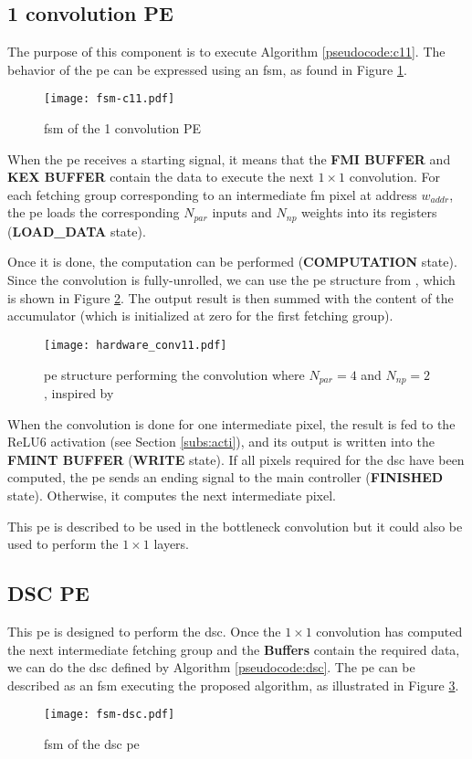 \subsection{1 convolution PE}
%
The purpose of this component is to execute Algorithm \ref{pseudocode:c11}. The behavior of the \acrshort{pe} can be expressed using an \acrshort{fsm}, as found in Figure \ref{fig:fsm_c11}.
%
\begin{figure}[H]
    \centering
    \texttt{[image: fsm-c11.pdf]}
    \caption{\acrshort{fsm} of the 1 convolution PE}
    \label{fig:fsm_c11}
\end{figure}
%
When the \acrshort{pe} receives a starting signal, it means that the \textbf{FMI BUFFER} and \textbf{KEX BUFFER} contain the data to execute the next $1 \times 1$ convolution. For each fetching group corresponding to an intermediate \acrshort{fm} pixel at address $w_{addr}$, the \acrshort{pe} loads the corresponding $N_{par}$ inputs and $N_{np}$ weights into its registers (\textbf{LOAD\_DATA} state).

Once it is done, the computation can be performed (\textbf{COMPUTATION} state). Since the convolution is fully-unrolled, we can use the \acrshort{pe} structure from \textcite{kang_accelerator-aware_2020}, which is shown in Figure \ref{fig:c11_hardware}. The output result is then summed with the content of the accumulator (which is initialized at zero for the first fetching group).
%
\begin{figure}[H]
    \centering
    \texttt{[image: hardware\_conv11.pdf]}
    \caption{\acrshort{pe} structure performing the convolution where $N_{par} = 4$ and $N_{np} = 2$, inspired by \cite{kang_accelerator-aware_2020}}
    \label{fig:c11_hardware}
\end{figure}

When the convolution is done for one intermediate pixel, the result is fed to the ReLU6 activation (see Section \ref{subs:acti}), and its output is written into the \textbf{FMINT BUFFER} (\textbf{WRITE} state). If all pixels required for the \acrshort{dsc} have been computed, the \acrshort{pe} sends an ending signal to the main controller (\textbf{FINISHED} state). Otherwise, it computes the next intermediate pixel.

This \acrshort{pe} is described to be used in the bottleneck convolution but it could also be used to perform the $1 \times 1$ layers.
%
\subsection{DSC PE}
%
This \acrshort{pe} is designed to perform the \acrshort{dsc}. Once the $1 \times 1$ convolution has computed the next intermediate fetching group and the \textbf{Buffers} contain the required data, we can do the \acrshort{dsc} defined by Algorithm \ref{pseudocode:dsc}. The \acrshort{pe} can be described as an \acrshort{fsm} executing the proposed algorithm, as illustrated in Figure \ref{fig:fsm_dsc}.
%
\begin{figure}[H]
    \centering
    \texttt{[image: fsm-dsc.pdf]}
    \caption{\acrshort{fsm} of the \acrshort{dsc} \acrshort{pe}}
    \label{fig:fsm_dsc}
\end{figure}


